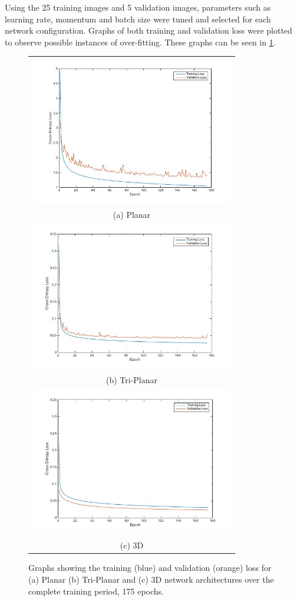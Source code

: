 \documentclass[11pt,a4paper]{memoir}
\numberwithin{figure}{section}
\numberwithin{table}{section}
\numberwithin{equation}{section}
\begin{document}
Using the 25 training images and 5 validation images, parameters such as learning rate, momentum and batch size  were tuned and selected for each network configuration. Graphs of both training and validation loss were plotted to observe possible instances of over-fitting. These graphs can be seen in \ref{fig:loss}.\\


\begin{figure}[!ht]
\centering
\begin{tabular}{c}
\includegraphics[height = 65mm]{plan_loss.jpg}\\
(a) Planar \\
\includegraphics[height = 65mm]{Tri_loss.jpg}\\
 (b) Tri-Planar \\
\includegraphics[height = 65mm]{three-loss.jpg} \\
 (c) 3D \\

\end{tabular}
\caption[Graphs of cross-entropy loss for training and validation of CNNs using CCBR data]{Graphs showing the training (blue) and validation (orange) loss for (a) Planar (b) Tri-Planar and (c) 3D network architectures over the complete training period, 175 epochs.}
\label{fig:loss}
\end{figure}
\end{document}
